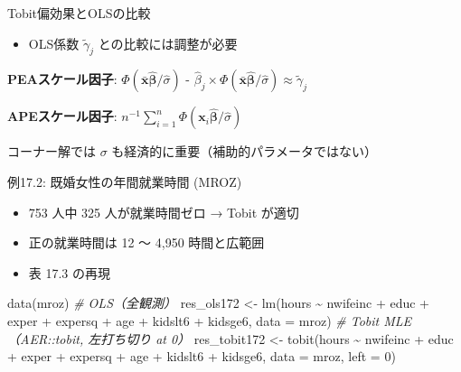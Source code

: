 \documentclass[
  ignorenonframetext,
]{beamer}
\newenvironment{Shaded}{\begin{snugshade}}{\end{snugshade}}
\newcommand{\AttributeTok}[1]{\textcolor[rgb]{0.77,0.63,0.00}{#1}}
\newcommand{\CommentTok}[1]{\textcolor[rgb]{0.56,0.35,0.01}{\textit{#1}}}
\newcommand{\DecValTok}[1]{\textcolor[rgb]{0.00,0.00,0.81}{#1}}
\newcommand{\FunctionTok}[1]{\textcolor[rgb]{0.00,0.00,0.00}{#1}}
\newcommand{\NormalTok}[1]{#1}
\newcommand{\OtherTok}[1]{\textcolor[rgb]{0.56,0.35,0.01}{#1}}
\newcommand{\SpecialCharTok}[1]{\textcolor[rgb]{0.00,0.00,0.00}{#1}}
\providecommand{\tightlist}{%
  \setlength{\itemsep}{0pt}\setlength{\parskip}{0pt}}
\begin{document}
\begin{frame}{Tobit偏効果とOLSの比較}
\protect\hypertarget{tobitux504fux52b9ux679cux3068olsux306eux6bd4ux8f03}{}
\begin{itemize}
\tightlist
\item
  OLS係数 \(\tilde{\gamma}_j\) との比較には調整が必要
\end{itemize}

\textbf{PEAスケール因子}:
\(\Phi(\bar{\mathbf{x}}\hat{\boldsymbol{\beta}}/\hat{\sigma})\) -
\(\hat{\beta}_j \times \Phi(\bar{\mathbf{x}}\hat{\boldsymbol{\beta}}/\hat{\sigma}) \approx \tilde{\gamma}_j\)

\textbf{APEスケール因子}:
\(n^{-1}\sum_{i=1}^n \Phi(\mathbf{x}_i\hat{\boldsymbol{\beta}}/\hat{\sigma})\)

コーナー解では \(\sigma\) も経済的に重要（補助的パラメータではない）
\end{frame}

\begin{frame}[fragile]{例17.2: 既婚女性の年間就業時間 (MROZ)}
\protect\hypertarget{ux4f8b17.2-ux65e2ux5a5aux5973ux6027ux306eux5e74ux9593ux5c31ux696dux6642ux9593-mroz}{}
\begin{itemize}
\tightlist
\item
  753 人中 325 人が就業時間ゼロ → Tobit が適切
\item
  正の就業時間は 12 〜 4,950 時間と広範囲
\item
  表 17.3 の再現
\end{itemize}

\footnotesize

\begin{Shaded}
\begin{Highlighting}[]
\FunctionTok{data}\NormalTok{(mroz)}
\CommentTok{\# OLS（全観測）}
\NormalTok{res\_ols172 }\OtherTok{\textless{}{-}} \FunctionTok{lm}\NormalTok{(hours }\SpecialCharTok{\textasciitilde{}}\NormalTok{ nwifeinc }\SpecialCharTok{+}\NormalTok{ educ }\SpecialCharTok{+}\NormalTok{ exper }\SpecialCharTok{+}\NormalTok{ expersq }\SpecialCharTok{+}
\NormalTok{                   age }\SpecialCharTok{+}\NormalTok{ kidslt6 }\SpecialCharTok{+}\NormalTok{ kidsge6, }\AttributeTok{data =}\NormalTok{ mroz)}
\CommentTok{\# Tobit MLE（AER::tobit, 左打ち切り at 0）}
\NormalTok{res\_tobit172 }\OtherTok{\textless{}{-}} \FunctionTok{tobit}\NormalTok{(hours }\SpecialCharTok{\textasciitilde{}}\NormalTok{ nwifeinc }\SpecialCharTok{+}\NormalTok{ educ }\SpecialCharTok{+}\NormalTok{ exper }\SpecialCharTok{+}\NormalTok{ expersq }\SpecialCharTok{+}
\NormalTok{                        age }\SpecialCharTok{+}\NormalTok{ kidslt6 }\SpecialCharTok{+}\NormalTok{ kidsge6,}
                      \AttributeTok{data =}\NormalTok{ mroz, }\AttributeTok{left =} \DecValTok{0}\NormalTok{)}
\end{Highlighting}
\end{Shaded}

\normalsize
\end{frame}
\end{document}
